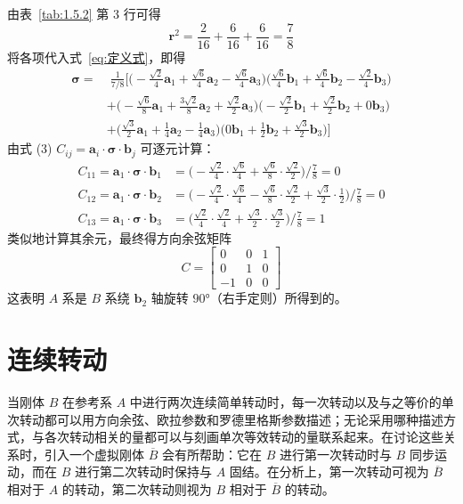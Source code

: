 \begin{solution}
由表~\ref{tab:1.5.2} 第 3 行可得
$$
\mathbf{r}^{2}=\frac{2}{16}+\frac{6}{16}+\frac{6}{16}=\frac{7}{8}
$$
将各项代入式~\eqref{eq:定义式}，即得
$$
\begin{aligned}
\boldsymbol{\sigma}
=&\;\frac{1}{7/8}\Big[
\bigl(-\tfrac{\sqrt{2}}{4}\mathbf{a}_1+\tfrac{\sqrt{6}}{4}\mathbf{a}_2-\tfrac{\sqrt{6}}{4}\mathbf{a}_3\bigr)\bigl(\tfrac{\sqrt{6}}{4}\mathbf{b}_1+\tfrac{\sqrt{6}}{4}\mathbf{b}_2-\tfrac{\sqrt{2}}{4}\mathbf{b}_3\bigr)\\
&+\bigl(-\tfrac{\sqrt{6}}{8}\mathbf{a}_1+\tfrac{3\sqrt{2}}{8}\mathbf{a}_2+\tfrac{\sqrt{2}}{2}\mathbf{a}_3\bigr)\bigl(-\tfrac{\sqrt{2}}{2}\mathbf{b}_1+\tfrac{\sqrt{2}}{2}\mathbf{b}_2+0\mathbf{b}_3\bigr)\\
&+\bigl(\tfrac{\sqrt{3}}{2}\mathbf{a}_1+\tfrac{1}{4}\mathbf{a}_2-\tfrac{1}{4}\mathbf{a}_3\bigr)\bigl(0\mathbf{b}_1+\tfrac{1}{2}\mathbf{b}_2+\tfrac{\sqrt{3}}{2}\mathbf{b}_3\bigr)\Big]
\end{aligned}
$$
由式 (3) $C_{ij}=\mathbf{a}_i\cdot\boldsymbol{\sigma}\cdot\mathbf{b}_j$ 可逐元计算：
$$
\begin{aligned}
C_{11}=\mathbf{a}_1\cdot\boldsymbol{\sigma}\cdot\mathbf{b}_1
&=\bigl(-\tfrac{\sqrt{2}}{4}\cdot\tfrac{\sqrt{6}}{4}+\tfrac{\sqrt{6}}{8}\cdot\tfrac{\sqrt{2}}{2}\bigr)\Big/\tfrac{7}{8}=0
\\[4pt]
C_{12}=\mathbf{a}_1\cdot\boldsymbol{\sigma}\cdot\mathbf{b}_2
&=\bigl(-\tfrac{\sqrt{2}}{4}\cdot\tfrac{\sqrt{6}}{4}-\tfrac{\sqrt{6}}{8}\cdot\tfrac{\sqrt{2}}{2}+\tfrac{\sqrt{3}}{2}\cdot\tfrac{1}{2}\bigr)\Big/\tfrac{7}{8}=0
\\[4pt]
C_{13}=\mathbf{a}_1\cdot\boldsymbol{\sigma}\cdot\mathbf{b}_3
&=\bigl(\tfrac{\sqrt{2}}{4}\cdot\tfrac{\sqrt{2}}{4}+\tfrac{\sqrt{3}}{2}\cdot\tfrac{\sqrt{3}}{2}\bigr)\Big/\tfrac{7}{8}=1
\end{aligned}
$$
类似地计算其余元，最终得方向余弦矩阵
$$
C=\begin{bmatrix}0 & 0 & 1\\ 0 & 1 & 0\\ -1 & 0 & 0\end{bmatrix}
$$
这表明 $A$ 系是 $B$ 系绕 $\mathbf{b}_2$ 轴旋转 $90°$（右手定则）所得到的。
\end{solution}
\section{连续转动}

当刚体 $B$ 在参考系 $A$ 中进行两次连续简单转动时，每一次转动以及与之等价的单次转动都可以用方向余弦、欧拉参数和罗德里格斯参数描述；无论采用哪种描述方式，与各次转动相关的量都可以与刻画单次等效转动的量联系起来。在讨论这些关系时，引入一个虚拟刚体 $\overline{B}$ 会有所帮助：它在 $B$ 进行第一次转动时与 $B$ 同步运动，而在 $B$ 进行第二次转动时保持与 $A$ 固结。在分析上，第一次转动可视为 $\overline{B}$ 相对于 $A$ 的转动，第二次转动则视为 $B$ 相对于 $\overline{B}$ 的转动。


